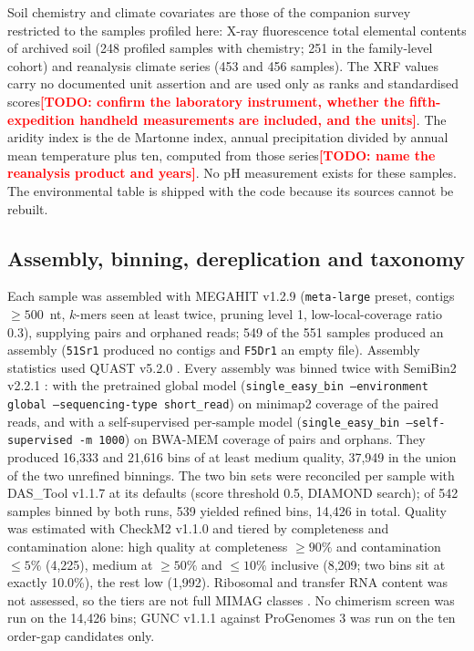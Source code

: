 \documentclass[11pt]{article}
\providecommand{\todo}[1]{\textcolor{red}{\textbf{[TODO: #1]}}}
\begin{document}
Soil chemistry and climate covariates are those of the companion survey restricted to the samples
profiled here: X-ray fluorescence total elemental contents of archived soil (248 profiled samples
with chemistry; 251 in the family-level cohort) and reanalysis climate series (453 and 456 samples).
The XRF values carry no documented unit assertion and are used only as ranks and standardised
scores\todo{confirm the laboratory instrument, whether the fifth-expedition handheld measurements
are included, and the units}. The aridity index is the de Martonne index, annual precipitation
divided by annual mean temperature plus ten, computed from those series\todo{name the reanalysis
product and years}. No pH measurement exists for these samples. The environmental table is shipped
with the code because its sources cannot be rebuilt.

\subsection*{Assembly, binning, dereplication and taxonomy}
Each sample was assembled with MEGAHIT v1.2.9 \citep{li2015megahit} (\texttt{meta-large} preset,
contigs $\geq 500$~nt, $k$-mers seen at least twice, pruning level 1, low-local-coverage ratio 0.3),
supplying pairs and orphaned reads; 549 of the 551 samples produced an assembly (\texttt{51Sr1}
produced no contigs and \texttt{F5Dr1} an empty file). Assembly statistics used QUAST v5.2.0
\citep{gurevich2013quast}. Every assembly was binned twice with SemiBin2 v2.2.1
\citep{pan2023semibin2}: with the pretrained global model (\texttt{single\_easy\_bin --environment
global --sequencing-type short\_read}) on minimap2 \citep{li2018minimap2} coverage of the paired
reads, and with a self-supervised per-sample model (\texttt{single\_easy\_bin --self-supervised -m
1000}) on BWA-MEM \citep{li2013bwamem} coverage of pairs and orphans. They produced 16{,}333 and
21{,}616 bins of at least medium quality, 37{,}949 in the union of the two unrefined binnings. The
two bin sets were reconciled per sample with DAS\_Tool v1.1.7 \citep{sieber2018dastool} at its
defaults (score threshold 0.5, DIAMOND search); of 542 samples binned by both runs, 539 yielded
refined bins, 14{,}426 in total. Quality was estimated with CheckM2 v1.1.0 \citep{chklovski2023checkm2}
and tiered by completeness and contamination alone: high quality at completeness $\geq 90\%$ and
contamination $\leq 5\%$ (4{,}225), medium at $\geq 50\%$ and $\leq 10\%$ inclusive (8{,}209; two
bins sit at exactly 10.0\%), the rest low (1{,}992). Ribosomal and transfer RNA content was not
assessed, so the tiers are not full MIMAG classes \citep{bowers2017mimag}. No chimerism screen was
run on the 14{,}426 bins; GUNC v1.1.1 \citep{orakov2021gunc} against ProGenomes 3 was run on the ten
order-gap candidates only.
\end{document}

